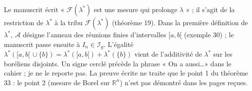 \documentclass[11pt,a4paper]{article}
\newcommand{\R}{\mathbb{R}}
\newcommand{\A}{\mathscr{A}}
\newcommand{\Ff}{\mathscr{F}}
\newcommand{\Ii}{\mathscr{I}}
\begin{document}
\begin{note}
Le manuscrit écrit « $\Ff(\lambda^*)$ est une mesure qui prolonge $\lambda$ » ; il s'agit de la restriction de $\lambda^*$ à la tribu $\Ff(\lambda^*)$ (théorème 19).
Dans la première définition de $\lambda^*$, $\A$ désigne l'anneau des réunions finies d'intervalles $[a,b[$ (exemple 30) ; le manuscrit passe ensuite à $I_n\in\Ii_g$.
L'égalité $\lambda^*([a,b[\,\cup\{b\})=\lambda^*([a,b[)+\lambda^*(\{b\})$ vient de l'additivité de $\lambda^*$ sur les boréliens disjoints.
Un signe cerclé précède la phrase « On a aussi\dots » dans le cahier ; je ne le reporte pas.
La preuve écrite ne traite que le point 1 du théorème 33 : le point 2 (mesure de Borel sur $\R^n$) n'est pas démontré dans les pages reçues.
\end{note}
\end{document}

